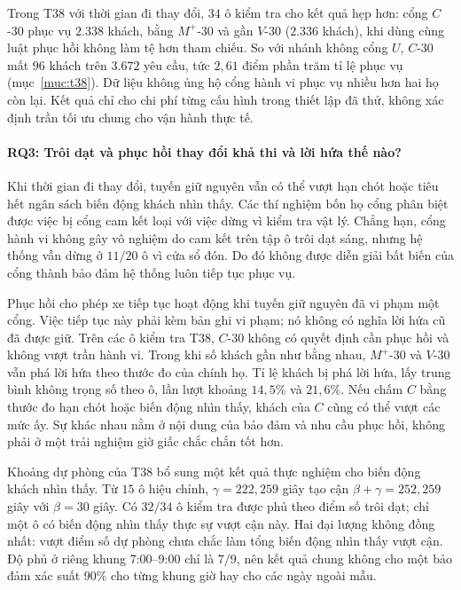 Trong T38 với thời gian đi thay đổi, $34$ ô kiểm tra cho kết quả hẹp hơn:
cổng $C$-30 phục vụ $2.338$ khách, bằng $M^{+}$-30 và gần $V$-30 ($2.336$ khách), khi dùng
cùng luật phục hồi không làm tệ hơn tham chiếu. So với nhánh không cổng $U$, $C$-30 mất
$96$ khách trên $3.672$ yêu cầu, tức $2{,}61$ điểm phần trăm tỉ lệ phục vụ
(mục~\ref{muc:t38}). Dữ liệu không ủng hộ cổng hành vi phục vụ nhiều hơn hai họ còn lại.
Kết quả chỉ cho chi phí từng cấu hình trong thiết lập đã thử, không xác định trần tối ưu
chung cho vận hành thực tế.

\paragraph{RQ3: Trôi dạt và phục hồi thay đổi khả thi và lời hứa thế nào?}
Khi thời gian đi thay đổi, tuyến giữ nguyên vẫn có thể vượt hạn chót hoặc tiêu hết ngân
sách biến động khách nhìn thấy. Các thí nghiệm bốn họ cổng phân biệt được việc bị cổng cam
kết loại với việc dừng vì kiểm tra vật lý. Chẳng hạn, cổng hành vi không gây vô nghiệm do
cam kết trên tập ô trôi dạt sáng, nhưng hệ thống vẫn dừng ở $11/20$ ô vì cửa sổ đón. Do
đó không được diễn giải bất biến của cổng thành bảo đảm hệ thống luôn tiếp tục phục vụ.

Phục hồi cho phép xe tiếp tục hoạt động khi tuyến giữ nguyên đã vi phạm một cổng. Việc
tiếp tục này phải kèm bản ghi vi phạm; nó không có nghĩa lời hứa cũ đã được giữ. Trên các
ô kiểm tra T38, $C$-30 không có quyết định cần phục hồi và không vượt trần hành vi.
Trong khi số khách gần như bằng nhau, $M^{+}$-30 và $V$-30 vẫn phá lời hứa theo thước đo
của chính họ. Tỉ lệ khách bị phá lời hứa, lấy trung bình không trọng số theo ô,
lần lượt khoảng $14{,}5\%$ và $21{,}6\%$. Nếu chấm $C$ bằng thước đo hạn chót hoặc biến
động nhìn thấy, khách của $C$ cũng có thể vượt các mức ấy. Sự khác nhau nằm ở nội dung
của bảo đảm và nhu cầu phục hồi, không phải ở một trải nghiệm giờ giấc chắc chắn tốt hơn.

Khoảng dự phòng của T38 bổ sung một kết quả thực nghiệm cho biến động khách nhìn thấy.
Từ $15$ ô hiệu chỉnh, $\gamma=222{,}259$ giây tạo cận
$\beta+\gamma=252{,}259$ giây với $\beta=30$ giây. Có $32/34$ ô kiểm tra được phủ
theo điểm số trôi dạt; chỉ một ô có biến động nhìn thấy thực sự vượt cận này.
Hai đại lượng không đồng nhất: vượt điểm số dự phòng chưa chắc làm tổng biến động nhìn
thấy vượt cận. Độ phủ ở riêng khung 7:00--9:00 chỉ là $7/9$, nên kết quả chung không
cho một bảo đảm xác suất 90\% cho từng khung giờ hay cho các ngày ngoài mẫu.

